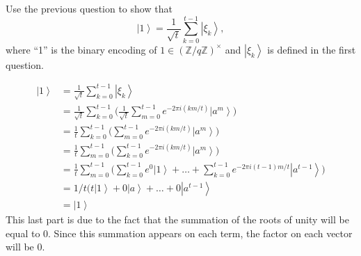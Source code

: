 \documentclass{exam} %
\newcommand{\ZZ}{\mathbb{Z}}
\theoremstyle{plain}
\theoremstyle{definition}
\theoremstyle{remark}
\numberwithin{equation}{section}  %
\newcommand{\ket}[1]{ \left| #1 \right> }
\begin{document}
\begin{questions}
\question Use the previous question to show that
\[
  \ket{1} = \frac{1}{\sqrt{t}} \sum_{k=0}^{t-1} \ket{\xi_k},
\]
where ``1'' is the binary encoding of $1 \in (\ZZ/q\ZZ)^\times$ and
$\ket{\xi_k}$ is defined in the first question.
\begin{solution}
  \begin{align*}
    \ket{1} 
    &= \frac{1}{\sqrt{t}} \sum_{k=0}^{t-1} \ket{\xi_k}\\
    &= \frac{1}{\sqrt{t}} \sum_{k=0}^{t-1} \big( \frac{1}{\sqrt{t}} \sum_{m=0}^{t-1} 
    e^{-2\pi i (km/t)} \ket{a^m}\big)\\
    &= \frac{1}{t} \sum_{k=0}^{t-1} \big(\sum_{m=0}^{t-1} e^{-2\pi i (km/t)} 
    \ket{a^m}\big)\\
    &= \frac{1}{t} \sum_{m=0}^{t-1} \big(\sum_{k=0}^{t-1} e^{-2\pi i (km/t)} 
    \ket{a^m}\big)\\
    &= \frac{1}{t} \sum_{m=0}^{t-1} \big(
    \sum_{k=0}^{t-1} e^{0}\ket{1}
    +\hdots+
    \sum_{k=0}^{t-1} e^{-2\pi i (t-1)m/t}\ket{a^{t-1}}
    \big)\\
    &= 1/t(t\ket{1} + 0\ket{a}+\hdots+0\ket{a^{t-1}}\\
    &= \ket{1}
  \end{align*}
  This last part is due to the fact that the summation of the roots of unity
  will be equal to 0. Since this summation appears on each term, the factor on
  each vector will be 0. 
\end{solution}
\end{questions} 
\end{document}

